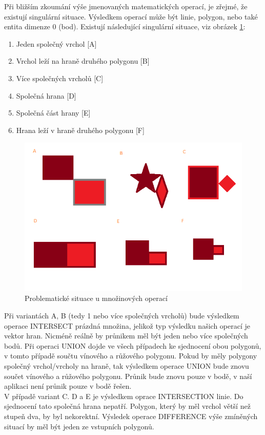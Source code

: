\documentclass[a4paper,11pt,twoside]{article}
\begin{document}
Při bližším zkoumání výše jmenovaných matematických operací, je zřejmé, že existují singulární situace. Výsledkem operací může být  linie, polygon, nebo také entita dimenze 0 (bod). Existují následující singulární situace, viz obrázek \ref{fig:problem}: 

\begin{enumerate}
\item Jeden společný vrchol [A]
\item Vrchol leží na hraně druhého polygonu [B]
\item Více společných vrcholů [C]
\item Společná hrana [D]
\item Společná část hrany [E]
\item Hrana leží v hraně druhého polygonu [F]
\end{enumerate}

\vspace{0.2cm}
\begin{figure}[hbt!] 
\begin{center}
\includegraphics[width=13cm]{pictures/problem.PNG} 
\caption[Problematické situace u množinových operací]{Problematické situace u množinových operací}
\label{fig:problem}
\end{center}
\end{figure}

\noindent Při variantách A, B (tedy 1 nebo více společných vrcholů) bude výsledkem operace INTERSECT prázdná množina, jelikož typ výsledku našich operací je vektor hran. Nicméně reálně by průnikem měl být jeden nebo více společných bodů. Při operaci UNION dojde ve všech případech ke sjednocení obou polygonů, v tomto případě součtu vínového a růžového polygonu. Pokud by měly polygony společný vrchol/vrcholy na hraně, tak výsledkem operace UNION bude znovu součet vínového a růžového polygonu. Průnik bude znovu pouze v bodě, v naší aplikaci není průnik pouze v bodě řešen. \\
\indent V případě variant C. D a E je výsledkem oprace INTERSECTION linie. Do sjednocení tato společná hrana nepatří. Polygon, který by měl vrchol větší než stupeň dva, by byl nekorektní. Výsledek operace DIFFERENCE výše zmíněných situací by měl být jeden ze vstupních polygonů.
\end{document}
